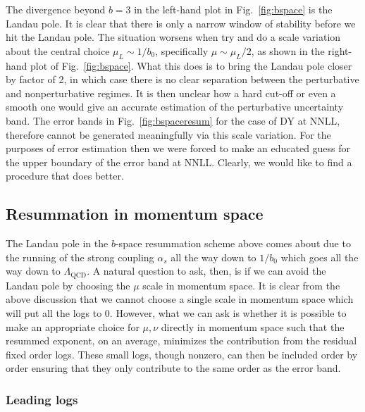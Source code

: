 \documentclass[a4,letterpaper,11pt]{article}
\newcommand{\Lqcd}{\Lambda_{\text{QCD}}}
\newcommand{\fig}[1]{Fig.~\ref{fig:#1}}
\begin{document}
The divergence beyond $b= 3$ in the left-hand plot in \fig{bspace} is the Landau pole. It is clear that there is only a narrow window of stability before we hit  the Landau pole. The situation worsens when try and do a scale variation about the central choice $ \mu_L \sim 1/b_0 $, specifically $\mu \sim \mu_L/2$, as shown in the right-hand plot of \fig{bspace}. What this does is to bring the Landau pole closer by factor of 2,  in which case there is no clear separation between the perturbative and nonperturbative regimes. It is then unclear how a hard cut-off or even a smooth one would give an accurate estimation of the perturbative uncertainty band.
The error bands in \fig{bspaceresum} for the case of DY at NNLL, therefore cannot be generated meaningfully via this scale variation. For the purposes of error estimation then we were forced to make an educated guess for the upper boundary of the error band at NNLL. Clearly, we would like to find a procedure that does better.


\subsection{Resummation in momentum space} \label{ssec:mom}

The Landau pole in the $b$-space resummation scheme above comes about due to the running of the strong coupling $\alpha_s$ all the way down to $1/b_0$ which goes all the way down to $\Lqcd$.
A natural question to ask, then, is if we can avoid the Landau pole by choosing the $\mu$ scale in momentum space. It is clear from the above discussion that we cannot choose a single scale in momentum space which will put all the logs to 0. However, what we can ask is whether it is possible to make an appropriate choice for $\mu,\nu$ directly in momentum space such that the resummed exponent, on an average, minimizes the contribution from the residual fixed order logs. These small logs, though nonzero, can then be included order by order ensuring that they only contribute to the same order as the error band.

\subsubsection{Leading logs}
\end{document}
